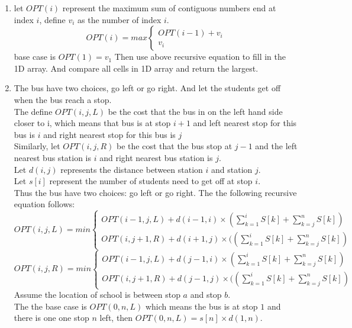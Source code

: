 \documentclass{article}
\begin{document}
\begin{enumerate}
\item let $OPT(i)$ represent the maximum sum of contiguous numbers end at index $i$, define $v_i$ as the number of index $i$.
\begin{equation}
OPT(i) = max
\begin{cases}
OPT(i-1) + v_i\\
v_{i}
\end{cases}
\end{equation}
base case is $OPT(1) = v_1$
Then use above recursive equation to fill in the 1D array. And compare all cells in 1D array and return the largest. 
\item The bus have two choices, go left or go right. And let the students get off when the bus reach a stop.  \\
The define $OPT(i,j,L)$ be the cost that the bus in on the left hand side closer to i, which means that bus is at stop $i+1$ and left nearest stop for this bus is $i$ and right nearest stop for this bus is $j$\\
Similarly, let $OPT(i,j,R)$ be the cost that the bus stop at $j-1$ and the left nearest bus station is $i$ and right nearest bus station is $j$.\\
Let $d(i,j)$ represents the distance between station $i$ and station $j$.  \\
Let $s[i]$ represent the number of students need to get off at stop $i$.\\
Thus the bus have two choices: go left or go right. The the following recursive equation follows: \\
\begin{equation}
OPT(i,j,L) = min
\begin{cases}
OPT(i-1,j,L) + d(i-1, i) \times (\sum_{k = 1}^{i}S[k] + \sum_{k = j}^{n}S[k]) \\
OPT(i, j+1, R) + d(i+1, j) \times ((\sum_{k = 1}^{i}S[k] + \sum_{k = j}^{n}S[k]) 
\end{cases} 
\end{equation}
\begin{equation}
OPT(i,j,R) = min
\begin{cases}
OPT(i-1,j,L) + d(j-1, i) \times (\sum_{k = 1}^{i}S[k] + \sum_{k = j}^{n}S[k]) \\
OPT(i, j+1, R) + d(j-1, j) \times ((\sum_{k = 1}^{i}S[k] + \sum_{k = j}^{n}S[k]) 
\end{cases} 
\end{equation}
Assume the location of school is between stop $a$ and stop $b$.\\
The the base case is $OPT(0,n,L)$ which means the bus is at stop $1$ and there is one one stop $n$ left, then $OPT(0,n,L) = s[n] \times d(1,n)$.

\end{enumerate}
\end{document}
